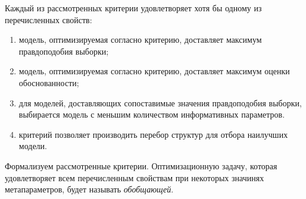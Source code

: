 Каждый из рассмотренных критерии удовлетворяет хотя бы одному из перечисленных свойств:
\begin{enumerate}
\item модель, оптимизируемая согласно критерию, доставляет максимум правдоподобия выборки;
\item модель, оптимизируемая согласно критерию, доставляет максимум оценки обоснованности;
\item для моделей, доставляющих сопоставимые значения правдоподобия выборки, выбирается модель с меньшим количеством информативных параметров.
\item критерий позволяет производить перебор структур для отбора наилучших модели.
\end{enumerate}

Формализуем рассмотренные критерии. Оптимизационную задачу, которая удовлетворяет всем перечисленным свойствам при некоторых значинях метапараметров, будет называть \textit{обобщающей}.

